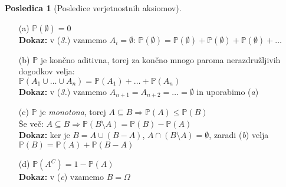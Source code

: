 \documentclass[11pt]{article}
\theoremstyle{definition}
\theoremstyle{definition}
\theoremstyle{definition}
\newtheorem*{posledica}{Posledica}
\begin{document}
\begin{posledica}[Posledice verjetnostnih aksiomov]
~
\begin{enumerate}

\item[(a)] $\mathbb{P}(\emptyset) = 0$ \\
\textbf{Dokaz:} v (\textit{3.}) vzamemo $A_i = \emptyset$: 
$\mathbb{P}(\emptyset) = \mathbb{P}(\emptyset) + \mathbb{P}(\emptyset) + \mathbb{P}(\emptyset) + \ldots$

\item[(b)] $\mathbb{P}$ je končno aditivna, torej za končno mnogo paroma nerazdružljivih dogodkov velja: \\
$\mathbb{P}(A_1 \cup \ldots \cup A_n) = \mathbb{P}(A_1) + \ldots + \mathbb{P}(A_n)$ \\
\textbf{Dokaz:} v (\textit{3.}) vzamemo $A_{n+1} = A_{n+2} = \ldots = \emptyset$ in uporabimo (\textit{a})

\item[(c)] $\mathbb{P}$ je \textit{monotona}, torej $A \subseteq B \Rightarrow \mathbb{P}(A) \leq \mathbb{P}(B)$ \\
Še več: $A \subseteq B \Rightarrow \mathbb{P}(B \setminus A) = \mathbb{P}(B) - \mathbb{P}(A)$ \\
\textbf{Dokaz:} ker je $B = A \cup (B-A)$, $A \cap (B \setminus A) = \emptyset$, zaradi (\textit{b}) velja $\mathbb{P}(B) = \mathbb{P}(A) + \mathbb{P}(B-A)$

\item[(d)] $\mathbb{P}(A^C) = 1 - \mathbb{P}(A)$ \\
\textbf{Dokaz:} v (\textit{c}) vzamemo $B = \Omega$


\end{enumerate}
\end{posledica}
\end{document}
